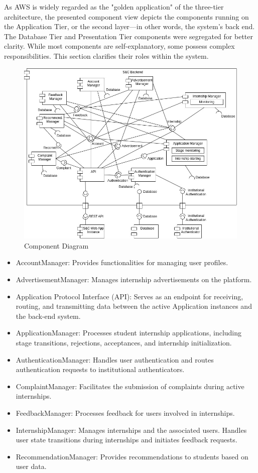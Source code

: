 As AWS is widely regarded as the "golden application" of the three-tier architecture, the presented component view depicts the components running on the Application Tier, or the second layer—in other words, the system's back end. The Database Tier and Presentation Tier components were segregated for better clarity. While most components are self-explanatory, some possess complex responsibilities. This section clarifies their roles within the system.

\begin{figure} [ht]
    \centering 
    \includegraphics[width=0.9\linewidth]{DD-Latex/assets/Component Diagram/Component Diagram.jpg} 
    \caption{Component Diagram} \label{fig:Component Diagram} 
\end{figure}

\sloppy
\begin{itemize}
    \item AccountManager: Provides functionalities for managing user profiles.
    \item AdvertisementManager: Manages internship advertisements on the platform.
    \item Application Protocol Interface (API): Serves as an endpoint for receiving, routing, and transmitting data between the active Application instances and the back-end system.
    \item ApplicationManager: Processes student internship applications, including stage transitions, rejections, acceptances, and internship initialization.
    \item AuthenticationManager: Handles user authentication and routes authentication requests to institutional authenticators.
    \item ComplaintManager: Facilitates the submission of complaints during active internships.
    \item FeedbackManager: Processes feedback for users involved in internships.
    \item InternshipManager: Manages internships and the associated users. Handles user state transitions during internships and initiates feedback requests.
    \item RecommendationManager: Provides recommendations to students based on user data.
\end{itemize}

